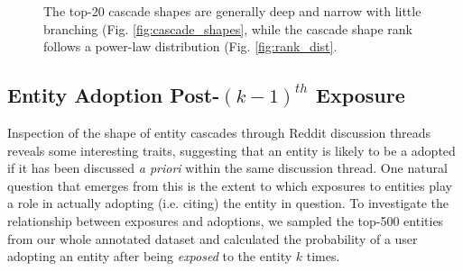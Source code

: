 \documentclass[journal,10pt,draftclsnofoot,onecolumn]{IEEEtran}
\begin{document}
\begin{figure}[ht!]
  \begin{center}
  \end{center}    
  \caption{The top-20 cascade shapes are generally deep and narrow with little branching (Fig. \ref{fig:cascade_shapes}, while the cascade shape rank follows a power-law distribution (Fig. \ref{fig:rank_dist}.}
  \label{fig:entity_cascades}
\end{figure}

\subsection{Entity Adoption Post-$({k-1})^{th}$ Exposure}
Inspection of the shape of entity cascades through Reddit discussion threads reveals some interesting traits, suggesting that an entity is likely to be a adopted if it has been discussed \emph{a priori} within the same discussion thread.
One natural question that emerges from this is the extent to which exposures to entities play a role in actually adopting (i.e. citing) the entity in question.
To investigate the relationship between exposures and adoptions, we sampled the top-500 entities from our whole annotated dataset and calculated the probability of a user adopting an entity after being \emph{exposed} to the entity $k$ times.
\end{document}
